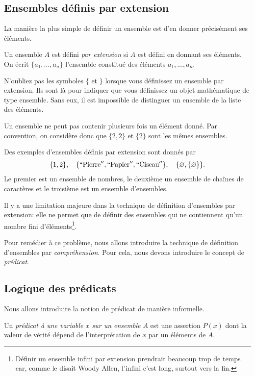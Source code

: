\documentclass[french,course,oneside,theoremnosection]{lecture}
\begin{document}
\subsection{Ensembles définis par extension}
La manière la plus simple de définir un ensemble est d'en donner précisément ses éléments.

\begin{definition}
Un ensemble $A$ est défini \emph{par extension} si $A$ est défini en donnant ses éléments. On écrit $\{a_1, \ldots, a_n\}$ l'ensemble constitué des éléments $a_1, \ldots, a_n$.
\end{definition}

N'oubliez pas les symboles $\{$ et $\}$ lorsque vous définissez un ensemble par extension. Ils sont là pour indiquer que vous définissez un objet mathématique de type ensemble. Sans eux, il est impossible de distinguer un ensemble de la liste des éléments.

\begin{notation}
Un ensemble ne peut pas contenir plusieurs fois un élément donné. Par convention, on considère donc que $\{2,2\}$ et $\{2\}$ sont les mêmes ensembles.
\end{notation}

Des exemples d'ensembles définis par extension sont donnés par
\[
\{1, 2\}, \quad \{``\text{Pierre}'',``\text{Papier}'', ``\text{Ciseau}'' \}, \quad \{\varnothing, \{\varnothing\}\}.
\]
Le premier est un ensemble de nombres, le deuxième un ensemble de chaînes de caractères et le troisième est un ensemble d'ensembles.

Il y a une limitation majeure dans la technique de définition d'ensembles par extension: elle ne permet que de définir des ensembles qui ne contiennent qu'un nombre fini d'éléments\footnote{Définir un ensemble infini par extension prendrait beaucoup trop de temps car, comme le disait Woody Allen, l'infini c'est long, surtout vers la fin.}.

Pour remédier à ce problème, nous allons introduire la technique de définition d'ensembles par \emph{compréhension}. Pour cela, nous devons introduire le concept de \emph{prédicat}.

\subsection{Logique des prédicats}
Nous allons introduire la notion de prédicat de manière informelle.

\begin{definition}
Un \emph{prédicat à une variable $x$ sur un ensemble $A$} est une assertion $P(x)$ dont la valeur de vérité dépend de l'interprétation de $x$ par un éléments de $A$.
\end{definition}
\end{document}
